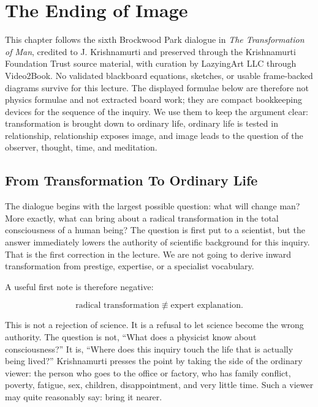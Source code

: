 \chapter{The Ending of Image}

This chapter follows the sixth Brockwood Park dialogue in \emph{The Transformation of Man}, credited to J. Krishnamurti and preserved through the Krishnamurti Foundation Trust source material, with curation by LazyingArt LLC through Video2Book. No validated blackboard equations, sketches, or usable frame-backed diagrams survive for this lecture. The displayed formulae below are therefore not physics formulae and not extracted board work; they are compact bookkeeping devices for the sequence of the inquiry. We use them to keep the argument clear: transformation is brought down to ordinary life, ordinary life is tested in relationship, relationship exposes image, and image leads to the question of the observer, thought, time, and meditation.

\section{From Transformation To Ordinary Life}

The dialogue begins with the largest possible question: what will change man? More exactly, what can bring about a radical transformation in the total consciousness of a human being? The question is first put to a scientist, but the answer immediately lowers the authority of scientific background for this inquiry. That is the first correction in the lecture. We are not going to derive inward transformation from prestige, expertise, or a specialist vocabulary.

A useful first note is therefore negative:

\begin{equation}
\text{radical transformation}
\not\equiv
\text{expert explanation}.
\end{equation}

This is not a rejection of science. It is a refusal to let science become the wrong authority. The question is not, ``What does a physicist know about consciousness?'' It is, ``Where does this inquiry touch the life that is actually being lived?'' Krishnamurti presses the point by taking the side of the ordinary viewer: the person who goes to the office or factory, who has family conflict, poverty, fatigue, sex, children, disappointment, and very little time. Such a viewer may quite reasonably say: bring it nearer.

